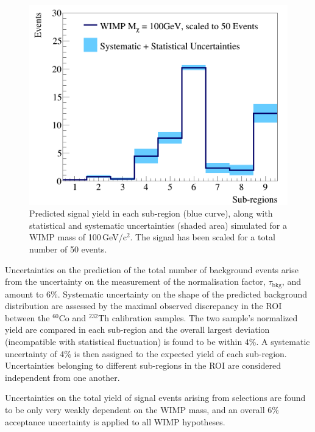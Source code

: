 \begin{figure}[t!]
  \includegraphics[width=\linewidth]{images/wimp_sys_unc.png}
\caption{Predicted signal yield in each sub-region (blue curve), along with statistical and systematic uncertainties (shaded area) simulated for a WIMP mass of 100\,GeV/c$^2$.  The signal has been scaled for a total number of 50 events.}
  \label{fig:unc}
\end{figure}


Uncertainties on the  prediction of the total number of background events arise from the uncertainty on the measurement of the normalisation 
factor, $\tau_{\text{bkg}}$, and amount to 6\%. %
Systematic uncertainty on the shape of the predicted background distribution are assessed by the maximal observed discrepancy in the ROI between
the $^{60}$Co and $^{232}$Th calibration samples. The two sample's normalized yield are compared in each sub-region and the overall largest deviation (incompatible
with statistical fluctuation) is found to be within 4\%.  A  systematic uncertainty of 4\% is then assigned  to the expected yield of each sub-region.
Uncertainties belonging to different sub-regions in the ROI are considered independent from one another.

Uncertainties on the total yield of signal events arising from selections are found to be only very weakly dependent on 
the WIMP mass, and an overall 6\% acceptance uncertainty is applied to all WIMP hypotheses. 

